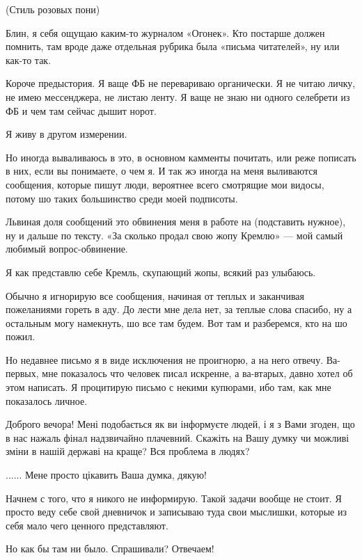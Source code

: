 \begin{multicols}{2} %
\setlength{\parindent}{0pt}

(Стиль розовых пони)

Блин, я себя ощущаю каким-то журналом «Огонек». Кто постарше должен помнить,
там вроде даже отдельная рубрика была «письма читателей», ну или как-то так.

Короче предыстория. Я ваще ФБ не перевариваю органически. Я не читаю личку, не
имею мессенджера, не листаю ленту. Я ваще не знаю ни одного селебрети из ФБ и
чем там сейчас дышит норот.

Я живу в другом измерении.

Но иногда вываливаюсь в это, в основном камменты почитать, или реже пописать в
них, если вы понимаете, о чем я. И так жэ иногда на меня выливаются сообщения,
которые пишут люди, вероятнее всего смотрящие мои видосы, потому шо таких
большинство среди моей подписоты.

Львиная доля сообщений это обвинения меня в работе на (подставить нужное), ну и
дальше по тексту. «За сколько продал свою жопу Кремлю» — мой самый любимый
вопрос-обвинение.

Я как представлю себе Кремль, скупающий жопы, всякий раз улыбаюсь.

Обычно я игнорирую все сообщения, начиная от теплых и заканчивая пожеланиями
гореть в аду. До лести мне дела нет, за теплые слова спасибо, ну а остальным
могу намекнуть, шо все там будем. Вот там и разберемся, кто на шо пожил.

Но недавнее письмо я в виде исключения не проигнорю, а на него отвечу.
Ва-первых, мне показалось что человек писал искренне, а ва-втарых, давно хотел
об этом написать. Я процитирую письмо с некими купюрами, ибо там, как мне
показалось личное. 

\begin{zzquote}
	
Доброго вечора! Мені подобається як ви інформуєте людей, і я з Вами згоден, що
в нас нажаль фінал надзвичайно плачевний. Скажіть на Вашу думку чи можливі
зміни в нашій державі на краще? Вся проблема в людях?

......
Мене просто цікавить Ваша думка, дякую!
\end{zzquote}

Начнем с того, что я никого не информирую. Такой задачи вообще не стоит. Я
просто веду себе свой дневничок и записываю туда свои мыслишки, которые из себя
мало чего ценного представляют.

Но как бы там ни было. Спрашивали? Отвечаем!


\end{multicols}
